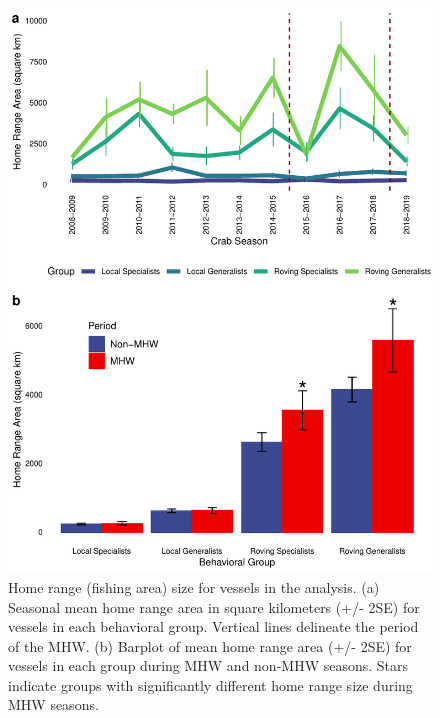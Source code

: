 \documentclass[9pt,twocolumn,twoside,lineno]{pnas-new}
\begin{document}
\begin{figure}%
\includegraphics[width=\linewidth]{fig_homerange.pdf}
\caption{Home range (fishing area) size for vessels in the analysis. (a) Seasonal mean home range area in square kilometers (+/- 2SE) for vessels in each behavioral group. Vertical lines delineate the period of the MHW. (b) Barplot of mean home range area (+/- 2SE) for vessels in each group during MHW and non-MHW seasons. Stars indicate groups with significantly different home range size during MHW seasons.}
\label{fig:homerange}
\end{figure}
\end{document}
